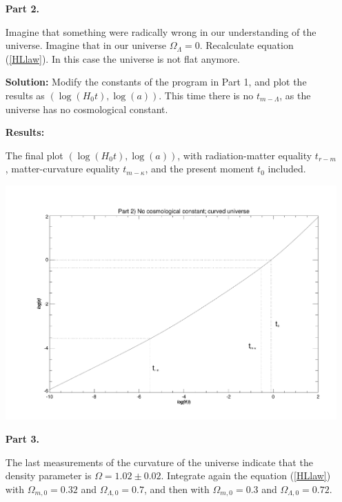 \documentclass[a4paper,12pt]{article}
\begin{document}
\begin{itemize}

\newpage
\item[\textbf{Part 2.}]

Imagine that something were radically wrong in our understanding of the universe. Imagine that in our universe $\Omega_{\Lambda}=0$. Recalculate equation (\ref{HLlaw}). In this case the universe is not flat anymore.

\vspace{0.5cm}
\textbf{Solution:}
Modify the constants of the program in Part 1, and plot the results as $(\log(H_0 t),\log(a))$. This time there is no $t_{m-\Lambda}$, as the universe has no cosmological constant.


\vspace*{0.5cm}
\textbf{Results:}

The final plot $(\log(H_0 t),\log(a))$, with radiation-matter equality $t_{r-m}$, matter-curvature equality $t_{m-\kappa}$, and the present moment $t_0$ included.

\centerline{\includegraphics[scale=0.6]{advanced_part2.pdf}}

\newpage
\item[\textbf{Part 3.}]

The last measurements of the curvature of the universe indicate that the density parameter is $\Omega=1.02 \pm 0.02$. Integrate again the equation (\ref{HLlaw}) with $\Omega_{m,0}=0.32$ and $\Omega_{\Lambda,0}=0.7$, and then with $\Omega_{m,0}=0.3$ and $\Omega_{\Lambda,0}=0.72$.


\end{itemize}
\end{document}

